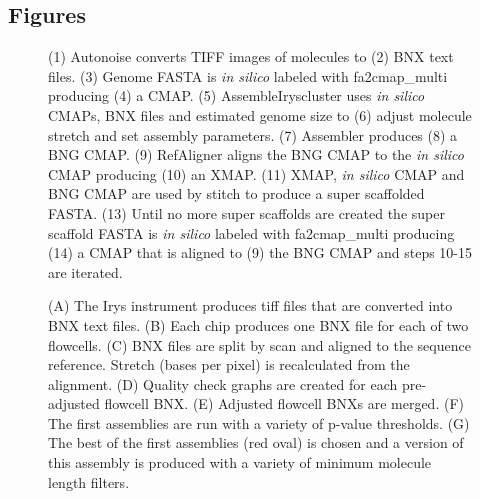 \documentclass{bmcart}
\begin{document}
\begin{backmatter}



\section*{Figures}
  \begin{figure}[h!]
  	\caption{
  		(1) Autonoise converts TIFF images of molecules to (2) BNX text files. (3) Genome FASTA is \textit{in silico} labeled with fa2cmap\_multi producing (4) a CMAP. (5) AssembleIryscluster uses \textit{in silico} CMAPs, BNX files and estimated genome size to (6) adjust molecule stretch and set assembly parameters. (7) Assembler produces (8) a BNG CMAP. (9) RefAligner aligns the BNG CMAP to the \textit{in silico} CMAP producing (10) an XMAP. (11) XMAP, \textit{in silico} CMAP and BNG CMAP are used by stitch to produce a super scaffolded FASTA. (13) Until no more super scaffolds are created the super scaffold FASTA is \textit{in silico} labeled with fa2cmap\_multi producing (14) a CMAP that is aligned to (9) the BNG CMAP and steps 10-15 are iterated.}
  \end{figure}
  \begin{figure}[h!]
  	\caption{
  		(A) The Irys instrument produces tiff files that are converted into BNX text files. (B) Each chip produces one BNX file for each of two flowcells. (C) BNX files are split by scan and aligned to the sequence reference. Stretch (bases per pixel) is recalculated from the alignment. (D) Quality check graphs are created for each pre-adjusted flowcell BNX. (E) Adjusted flowcell BNXs are merged. (F) The first assemblies are run with a variety of p-value thresholds. (G) The best of the first assemblies (red oval) is chosen and a version of this assembly is produced with a variety of minimum molecule length filters.}
  \end{figure}

\end{backmatter}
\end{document}
